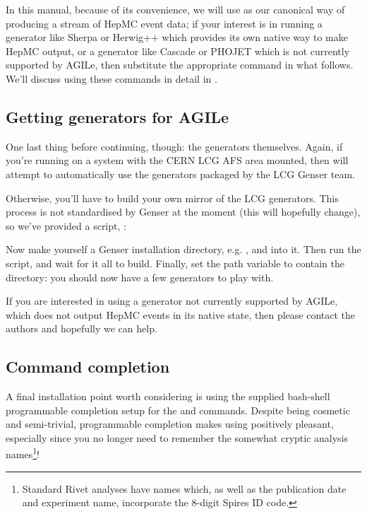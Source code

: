\documentclass{JHEP3}
\begin{document}
In this manual, because of its convenience, we will use  as our
canonical way of producing a stream of HepMC event data; if your interest is in
running a generator like Sherpa\cite{Gleisberg:2008ta} or Herwig++\cite{Bahr:2008pv} which provides its own native way to
make HepMC output, or a generator like Cascade\cite{Jung:2000hk} or PHOJET which is not currently
supported by AGILe, then substitute the appropriate command in what follows.
We'll discuss using these commands in detail in .


\subsection{Getting generators for AGILe}
\label{sec:genser}

One last thing before continuing, though: the generators themselves. Again, if
you're running on a system with the CERN LCG AFS area mounted, then
 will attempt to automatically use the generators packaged by the
LCG Genser team.

Otherwise, you'll have to build your own mirror of the LCG generators. This
process is not standardised by Genser at the moment (this will hopefully
change), so we've provided a script, :\\

Now make yourself a Genser installation directory, e.g. ,
and  into it. Then run the  script, and wait
for it all to build. Finally, set the  path variable to
contain the  directory: you should now have a few
generators to play with.

If you are interested in using a generator not currently supported by AGILe,
which does not output HepMC events in its native state, then please contact the
authors and hopefully we can help.


\subsection{Command completion}

A final installation point worth considering is using the supplied bash-shell
programmable completion setup for the  and 
commands. Despite being cosmetic and semi-trivial, programmable completion makes
using  positively pleasant, especially since you no longer need to
remember the somewhat cryptic analysis names\footnote{Standard Rivet analyses
  have names which, as well as the publication date and experiment name,
  incorporate the 8-digit Spires ID code.}!
\end{document}
